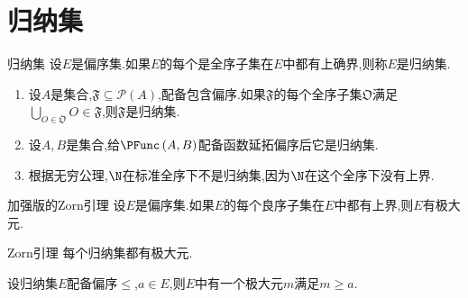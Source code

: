 \section{归纳集}

\begin{definition}{归纳集}{}
	设$E$是偏序集.如果$E$的每个是全序子集在$E$中都有上确界,则称$E$是归纳集.
\end{definition}

\begin{example}{}{}
	\begin{enumerate}
		\item 设$A$是集合,$\mathfrak{F}\subseteq\mathcal{P}\left(A\right)$,配备包含偏序.如果$\mathfrak{F}$的每个全序子集$\mathfrak{O}$满足$\bigcup\limits_{O\in\mathfrak{O}}O\in\mathfrak{F}$,则$\mathfrak{F}$是归纳集.
		\item 设$A,B$是集合,给$\PFunc\left(A,B\right)$配备函数延拓偏序后它是归纳集.
		\item 根据无穷公理,$\N$在标准全序下不是归纳集,因为$\N$在这个全序下没有上界.
	\end{enumerate}
\end{example}

\begin{proposition}{加强版的Zorn引理}{}
	设$E$是偏序集.如果$E$的每个良序子集在$E$中都有上界,则$E$有极大元.
\end{proposition}

\begin{theorem}{Zorn引理}{}
	每个归纳集都有极大元.
\end{theorem}

\begin{corollary}{}{}
	设归纳集$E$配备偏序$\leq$,$a\in E$,则$E$中有一个极大元$m$满足$m\geq a$.
\end{corollary}

